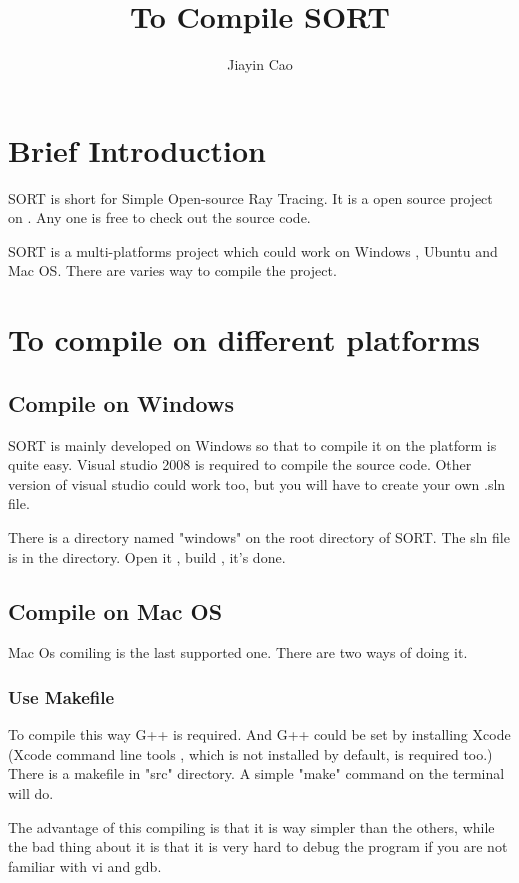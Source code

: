 \documentclass[10pt,a4paper]{article}
\title{ To Compile SORT }
\author{ Jiayin Cao }
\begin{document}
\maketitle

\section{ Brief Introduction }
SORT is short for Simple Open-source Ray Tracing.
It is a open source project on 
\href{http://sourceforge.net/projects/soraytrace/?source=directory}{\color{blue}{sourceforge}}.
Any one is free to check out the source code.

SORT is a multi-platforms project which could work on Windows , Ubuntu and Mac OS.
There are varies way to compile the project.

\section{ To compile on different platforms }
\subsection{ Compile on Windows }
SORT is mainly developed on Windows so that to compile it on the platform is quite easy.
Visual studio 2008 is required to compile the source code.
Other version of visual studio could work too, but you will have to create your own .sln file.

There is a directory named "windows" on the root directory of SORT.
The sln file is in the directory.
Open it , build , it's done.

\subsection{ Compile on Mac OS }
Mac Os comiling is the last supported one.
There are two ways of doing it.
\subsubsection{ Use Makefile }
To compile this way G++ is required. And G++ could be set by installing Xcode (Xcode command line tools , which is not installed by default, is required too.)
There is a makefile in "src" directory. 
A simple "make" command on the terminal will do.

The advantage of this compiling is that it is way simpler than the others,
while the bad thing about it is that it is very hard to debug the program if you are not familiar with vi and gdb.
\end{document}
